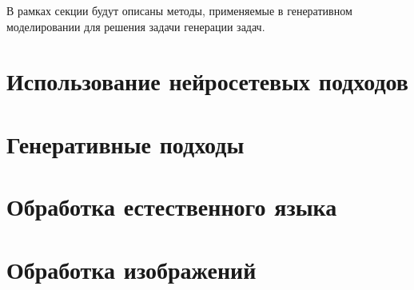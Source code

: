 В рамках секции будут описаны методы, применяемые в генеративном моделировании
для решения задачи генерации задач.

\section{Использование нейросетевых подходов}



\section{Генеративные подходы}



\section{Обработка естественного языка}



\section{Обработка изображений}



